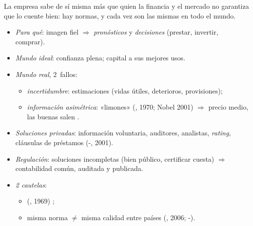 \documentclass{article}
\begin{document}
\begin{columnas}
\begin{itemize}
\end{itemize}

\begin{ideaclave}
La empresa sabe de sí misma más que quien la financia y el mercado no garantiza que lo cuente bien: hay normas, y cada vez son las mismas en todo el mundo.
\end{ideaclave}

\begin{itemize}
\item \emph{Para qué}: imagen fiel $\Rightarrow$ \emph{pronósticos} y \emph{decisiones} (prestar, invertir, comprar).
\item \emph{Mundo ideal}: confianza plena; capital a sus mejores usos.
\item \emph{Mundo real}, 2~fallos:
  \begin{itemize}
  \item \emph{incertidumbre}: estimaciones (vidas útiles, deterioros, provisiones);
  \item \emph{información asimétrica}: «limones» (, 1970; Nobel 2001) $\Rightarrow$ precio medio, las buenas salen .
  \end{itemize}
\item \emph{Soluciones privadas}: información voluntaria, auditores, analistas, \emph{rating}, cláusulas de préstamos (-, 2001).
\item \emph{Regulación}: soluciones incompletas (bien público, certificar cuesta) $\Rightarrow$ contabilidad común, auditada y publicada.
\item \emph{2 cautelas}:
  \begin{itemize}
  \item {} (, 1969) ;
  \item misma norma $\neq$ misma calidad entre países (, 2006; -).
  \end{itemize}
\end{itemize}


\end{columnas}
\end{document}
